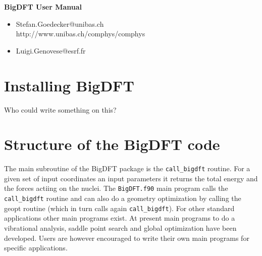 \documentclass[a4paper,11pt]{report}
\begin{document}

\begin{center} \huge
{\bf \color{red} BigDFT User Manual}
\end{center}

\large
\begin{itemize}
\item Stefan.Goedecker@unibas.ch \\
http://www.unibas.ch/comphys/comphys \\
\item Luigi.Genovese@esrf.fr
\end{itemize}
\normalsize

\pagebreak
\chapter{Installing BigDFT}
Who could write something on this?

\chapter{Structure of the BigDFT code}
\noindent
The main subroutine of the BigDFT package is the \texttt{call\_bigdft} routine. For a given set of input coordinates 
an input parameters it returns the total energy and the forces actiing on the nuclei. The \texttt{BigDFT.f90} main program 
calls the \texttt{call\_bigdft} routine and can also do a geometry optimization by calling the geopt routine (which in turn calls 
again \texttt{call\_bigdft}). For other standard applications other main programs exist.
At present main programs to do a vibrational analysis, saddle point search and global optimization have been developed.
Users are however encouraged to write their own main programs for specific applications. 
\end{document}
